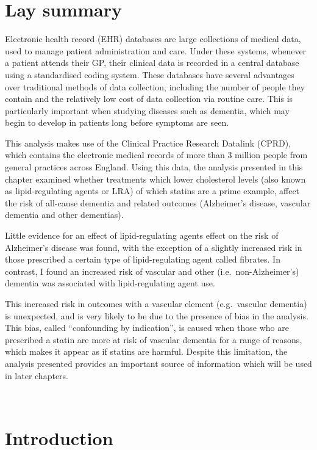 \documentclass[a4paper, twoside]{templates/ociamthesis}
\begin{document}
\minitoc 

\hypertarget{lay-summary-4}{%
\section{Lay summary}\label{lay-summary-4}}

Electronic health record (EHR) databases are large collections of medical data, used to manage patient administration and care. Under these systems, whenever a patient attends their GP, their clinical data is recorded in a central database using a standardised coding system. These databases have several advantages over traditional methods of data collection, including the number of people they contain and the relatively low cost of data collection via routine care. This is particularly important when studying diseases such as dementia, which may begin to develop in patients long before symptoms are seen.

This analysis makes use of the Clinical Practice Research Datalink (CPRD), which contains the electronic medical records of more than 3 million people from general practices across England. Using this data, the analysis presented in this chapter examined whether treatments which lower cholesterol levels (also known as lipid-regulating agents or LRA) of which statins are a prime example, affect the risk of all-cause dementia and related outcomes (Alzheimer's disease, vascular dementia and other dementias).

Little evidence for an effect of lipid-regulating agents effect on the risk of Alzheimer's disease was found, with the exception of a slightly increased risk in those prescribed a certain type of lipid-regulating agent called fibrates. In contrast, I found an increased risk of vascular and other (i.e.~non-Alzheimer's) dementia was associated with lipid-regulating agent use.

This increased risk in outcomes with a vascular element (e.g.~vascular dementia) is unexpected, and is very likely to be due to the presence of bias in the analysis. This bias, called ``confounding by indication'', is caused when those who are prescribed a statin are more at risk of vascular dementia for a range of reasons, which makes it appear as if statins are harmful. Despite this limitation, the analysis presented provides an important source of information which will be used in later chapters.

~

\hypertarget{introduction-2}{%
\section{Introduction}\label{introduction-2}}
\end{document}
